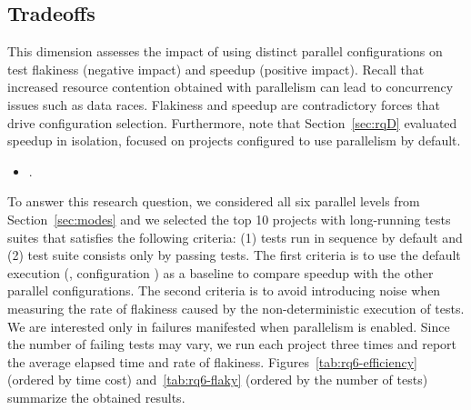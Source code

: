\begin{center}
\end{center}

\subsection{Tradeoffs}
\label{sec:rq6-tradeoffs}

This dimension assesses the impact of using distinct parallel
configurations on test flakiness (negative impact) and speedup
(positive impact).  Recall that increased resource contention obtained
with parallelism can lead to concurrency issues such as data races.
Flakiness and speedup are contradictory forces that drive
configuration selection.  Furthermore, note that Section~\ref{sec:rqD}
evaluated speedup in isolation, focused on projects configured to use
parallelism by default.

\begin{itemize}
    \item \numRQF{}. \textbf{\RQF{}}
\end{itemize}

To answer this research question, we considered all six parallel
levels from Section~\ref{sec:modes} and we selected the top 10
projects with long-running tests suites that satisfies the following
criteria: (1) tests run in sequence by default and (2) test suite
consists only by passing tests. The first criteria is to use the
default execution (\ie, configuration \Seq{}) as a baseline to compare
speedup with the other parallel configurations. The second criteria is
to avoid introducing noise when measuring the rate of flakiness caused
by the non-deterministic execution of tests. We are interested only in
failures manifested when parallelism is enabled. Since the number of
failing tests may vary, we run each project three times and report the
average elapsed time and rate of flakiness.
Figures~\ref{tab:rq6-efficiency} (ordered by time cost)
and~\ref{tab:rq6-flaky} (ordered by the number of tests) summarize the
obtained results.

